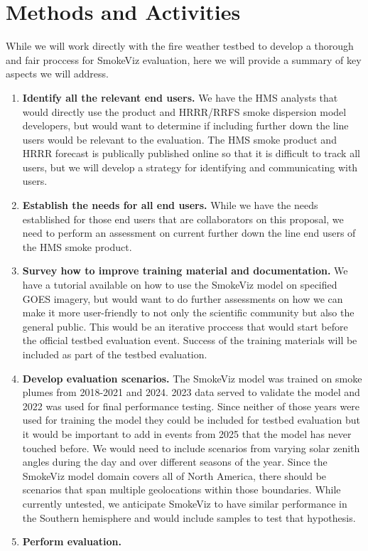 \section{Methods and Activities}

While we will work directly with the fire weather testbed to develop a thorough and fair proccess for SmokeViz evaluation, here we will provide a summary of key aspects we will address.

\begin{enumerate}
    \item \textbf{Identify all the relevant end users.} We have the HMS analysts that would directly use the product and HRRR/RRFS smoke dispersion model developers, but would want to determine if including further down the line users would be relevant to the evaluation. The HMS smoke product and HRRR forecast is publically published online so that it is difficult to track all users, but we will develop a strategy for identifying and communicating with users.

    \item \textbf{Establish the needs for all end users.} While we have the needs established for those end users that are collaborators on this proposal, we need to perform an assessment on current further down the line end users of the HMS smoke product.

    \item \textbf{Survey how to improve training material and documentation.} We have a tutorial available on how to use the SmokeViz model on specified GOES imagery, but would want to do further assessments on how we can make it more user-friendly to not only the scientific community but also the general public. This would be an iterative proccess that would start before the official testbed evaluation event. Success of the training materials will be included as part of the testbed evaluation.

    \item \textbf{Develop evaluation scenarios.} The SmokeViz model was trained on smoke plumes from 2018-2021 and 2024. 2023 data served to validate the model and 2022 was used for final performance testing. Since neither of those years were used for training the model they could be included for testbed evaluation but it would be important to add in events from 2025 that the model has never touched before. We would need to include scenarios from varying solar zenith angles during the day and over different seasons of the year. Since the SmokeViz model domain covers all of North America, there should be scenarios that span multiple geolocations within those boundaries. While currently untested, we anticipate SmokeViz to have similar performance in the Southern hemisphere and would include samples to test that hypothesis.

    \item \textbf{Perform evaluation.} 

\end{enumerate}


